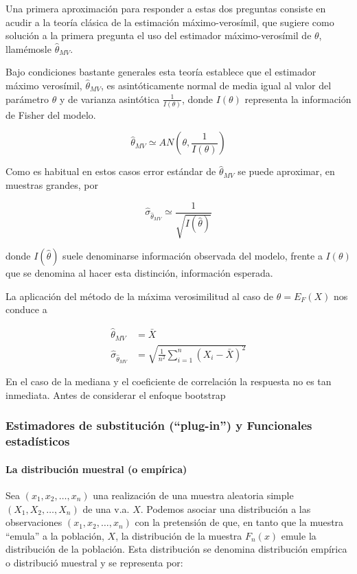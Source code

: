 \documentclass[
]{article}
\begin{document}
Una primera aproximación para responder a estas dos preguntas consiste en acudir a la teoría clásica de la estimación máximo-verosímil, que sugiere como solución a la primera pregunta el uso del estimador máximo-verosímil de \(\theta\), llamémosle \(\hat{\theta}_{M V}\).

Bajo condiciones bastante generales esta teoría establece que el estimador máximo verosímil, \(\hat{\theta}_{M V}\), es asintóticamente normal de media igual al valor del parámetro \(\theta\) y de varianza asintótica \(\frac{1}{I(\theta)}\), donde \(I(\theta)\) representa la información de Fisher del modelo.

\[
\hat{\theta}_{M V} \simeq A N\left(\theta, \frac{1}{I(\theta)}\right)
\]

Como es habitual en estos casos error estándar de \(\hat{\theta}_{M V}\) se puede aproximar, en muestras grandes, por

\[
\hat{\sigma}_{\hat{\theta}_{M V}} \simeq \frac{1}{\sqrt{I(\hat{\theta})}}
\]

donde \(I(\hat{\theta})\) suele denominarse información observada del modelo, frente a \(I(\theta)\) que se denomina al hacer esta distinción, información esperada.

La aplicación del método de la máxima verosimilitud al caso de \(\theta= E_{F}(X)\) nos conduce a

\[
\begin{aligned}
\hat{\theta}_{M V} & =\bar{X} \\
\hat{\sigma}_{\hat{\theta}_{M V}} & =\sqrt{\frac{1}{n^{2}} \sum_{i=1}^{n}\left(X_{i}-\bar{X}\right)^{2}}
\end{aligned}
\]

En el caso de la mediana y el coeficiente de correlación la respuesta no es tan inmediata. Antes de considerar el enfoque bootstrap

\subsubsection{Estimadores de substitución (``plug-in'') y Funcionales estadísticos}\label{estimadores-de-substituciuxf3n-plug-in-y-funcionales-estaduxedsticos}

\paragraph{La distribución muestral (o empírica)}\label{la-distribuciuxf3n-muestral-o-empuxedrica}

Sea \(\left(x_{1}, x_{2}, \ldots, x_{n}\right)\) una realización de una muestra aleatoria simple \(\left(X_{1}, X_{2}, \ldots, X_{n}\right)\) de una v.a. \(X\). Podemos asociar una distribución a las observaciones \(\left(x_{1}, x_{2}, \ldots, x_{n}\right)\) con la pretensión de que, en tanto que la muestra ``emula'' a la población, \(X\), la distribución de la muestra \(F_{n}(x)\) emule la distribución de la población. Esta distribución se denomina distribución empírica o distribució muestral y se representa por:
\end{document}
